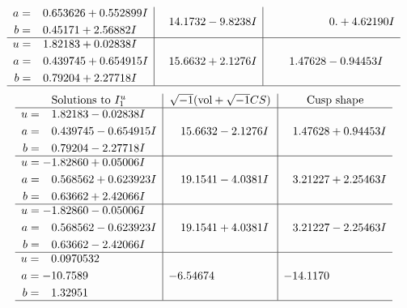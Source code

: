 \documentclass[1p]{elsarticle_modified}
\theoremstyle{definition}
\newcommand{\I}{\sqrt{-1}}
\begin{document}
$$\begin{array}{c|c|c}
\begin{aligned}
a &= \phantom{-}0.653626 + 0.552899 I \\
b &= \phantom{-}0.45171 + 2.56882 I\end{aligned}
 & \phantom{-}14.1732 - 9.8238 I & \phantom{-0.000000 -}0. + 4.62190 I \\ \hline\begin{aligned}
u &= \phantom{-}1.82183 + 0.02838 I \\
a &= \phantom{-}0.439745 + 0.654915 I \\
b &= \phantom{-}0.79204 + 2.27718 I\end{aligned}
 & \phantom{-}15.6632 + 2.1276 I & \phantom{-}1.47628 - 0.94453 I\\
 \hline 
 \end{array}$$\newpage$$\begin{array}{c|c|c}  
\text{Solutions to }I^u_{1}& \I (\text{vol} + \sqrt{-1}CS) & \text{Cusp shape}\\
 \hline 
\begin{aligned}
u &= \phantom{-}1.82183 - 0.02838 I \\
a &= \phantom{-}0.439745 - 0.654915 I \\
b &= \phantom{-}0.79204 - 2.27718 I\end{aligned}
 & \phantom{-}15.6632 - 2.1276 I & \phantom{-}1.47628 + 0.94453 I \\ \hline\begin{aligned}
u &= -1.82860 + 0.05006 I \\
a &= \phantom{-}0.568562 + 0.623923 I \\
b &= \phantom{-}0.63662 + 2.42066 I\end{aligned}
 & \phantom{-}19.1541 - 4.0381 I & \phantom{-}3.21227 + 2.25463 I \\ \hline\begin{aligned}
u &= -1.82860 - 0.05006 I \\
a &= \phantom{-}0.568562 - 0.623923 I \\
b &= \phantom{-}0.63662 - 2.42066 I\end{aligned}
 & \phantom{-}19.1541 + 4.0381 I & \phantom{-}3.21227 - 2.25463 I \\ \hline\begin{aligned}
u &= \phantom{-}0.0970532\phantom{ +0.000000I} \\
a &= -10.7589\phantom{ +0.000000I} \\
b &= \phantom{-}1.32951\phantom{ +0.000000I}\end{aligned}
 & -6.54674\phantom{ +0.000000I} & -14.1170\phantom{ +0.000000I}\\
 \hline 
 \end{array}$$\newpage\newpage\renewcommand{\arraystretch}{1}
\end{document}
